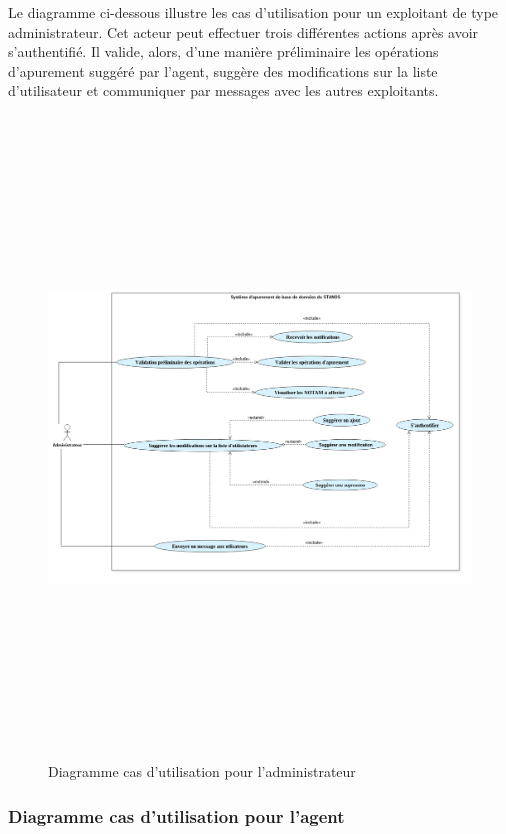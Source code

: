 Le diagramme ci-dessous illustre les cas d’utilisation pour un exploitant de type administrateur. Cet acteur peut effectuer trois différentes actions après avoir s’authentifié. Il valide, alors, d’une manière préliminaire les opérations d’apurement suggéré par l’agent, suggère des modifications sur la liste d’utilisateur et communiquer par messages avec les autres exploitants.\\


\begin{figure}[!h]
\begin{center}
\includegraphics[width=17cm,height=17cm]{besoins/administrateur.png}
\end{center}
\caption{Diagramme cas d'utilisation pour l'administrateur}
\end{figure}


\subsubsection{Diagramme cas d'utilisation pour l'agent}

